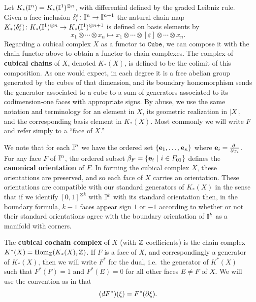 Let $K_*(\mathbb{I}^n) = K_*(\mathbb{I}^1)^{\otimes n}$, with differential defined by the graded Leibniz rule.
Given a face inclusion $\delta_i^{\varepsilon} \colon \mathbb{I}^n \to \mathbb{I}^{n+1}$ the natural chain map $K_*(\delta_i^{\varepsilon}) \colon K_*(\mathbb{I}^1)^{\otimes n} \to K_*(\mathbb{I}^1)^{\otimes n+1}$ is defined on basis elements by
\begin{equation*}
x_1 \otimes \cdots \otimes x_n \mapsto
x_1 \otimes \cdots \otimes [\underline{\varepsilon}] \otimes \cdots \otimes x_n.
\end{equation*}
Regarding a cubical complex $X$ as a functor to $\mathtt{Cube}$, we can compose it with the chain functor above to obtain a functor to chain complexes.
The complex of \textbf{cubical chains} of $X$, denoted $K_*(X)$, is defined to be the colimit of this composition.
As one would expect, in each degree it is a free abelian group generated by the cubes of that dimension, and its boundary homomorphism sends the
generator associated to a cube to a sum of generators associated to its codimension-one faces with appropriate signs. By abuse, we use the same notation and terminology for an element in $X$, its geometric realization in $|X|$,
and the corresponding basis element in $K_*(X)$. Most commonly we will write $F$ and refer simply to a ``face of $X$.''

We note that for each $\mathbb{I}^n$ we have the ordered set $\{\mathbf{e}_1, \dots, \mathbf{e}_n\}$ where $\e_i = \frac{\partial\ }{\partial x_i}$.
For any face $F$ of $\mathbb{I}^n$, the ordered subset $\beta_F = \{\mathbf{e}_i\ |\ i \in F_{01}\}$ defines the \textbf{canonical orientation} of $F$. In forming the cubical complex $X$, these orientations are preserved, and so each face of $X$ carries an orientation. These orientations are compatible with our standard generators of $K_*(X)$ in the sense that if we identify $[0,1]^{\otimes k}$ with $\mathbb{I}^k$ with its standard orientation then, in the boundary formula, $k-1$ faces appear sign $1$ or $-1$ according to whether or not their standard orientations agree with the boundary orientation of $\mathbb{I}^k$ as a manifold with corners.




The \textbf{cubical cochain complex} of $X$ (with $\mathbb{Z}$ coefficients) is the chain complex $K^*(X) = \textup{Hom}_{\mathbb{Z}}(K_*(X), \mathbb{Z})$. If $F$ is a face of $X$, and correspondingly a generator of $K_*(X)$, then we will write $F^*$ for the dual, i.e.\ the generator of $K^*(X)$ such that $F^*(F)=1$ and $F^*(E)=0$ for all other faces $E\neq F$ of $X$. We will use the convention as in \cite{Mun84} that
$$(dF^*)(\xi)=F^*(\partial \xi).$$





